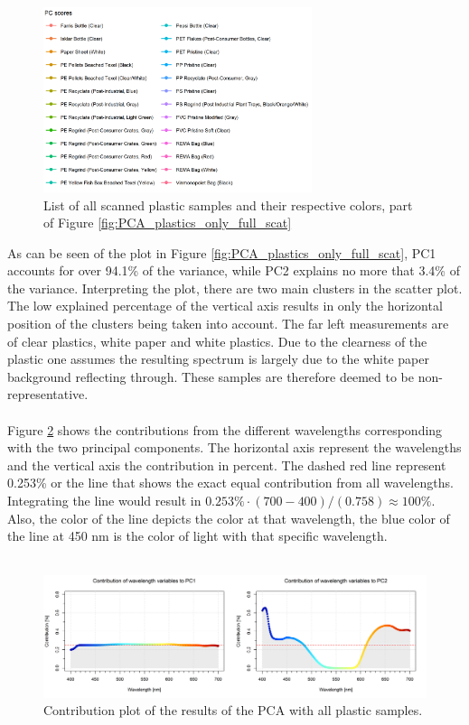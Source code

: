 \begin{figure}[H]
   \centering
    \includegraphics[width=0.7\textwidth]{Images/results/PCA_plastics_full_list.png}
\captionsetup{labelformat=empty}
  \caption[PCA Full Set List]{List of all scanned plastic samples and their respective colors, part of Figure \ref{fig:PCA_plastics_only_full_scat}}
  \label{fig:PCA_plastics_full_list}
\end{figure}
\noindent
As can be seen of the plot in Figure \ref{fig:PCA_plastics_only_full_scat}, PC1 accounts for over 94.1\% of the variance, while PC2 explains no more that 3.4\% of the variance. Interpreting the plot, there are two main clusters in the scatter plot. The low explained percentage of the vertical axis results in only the horizontal position of the clusters being taken into account. The far left measurements are of clear plastics, white paper and white plastics. Due to the clearness of the plastic one assumes the resulting spectrum is largely due to the white paper background reflecting through. These samples are therefore deemed to be non-representative.
\\\\
Figure \ref{fig:PCA_plastics_full_doub_cont} shows the contributions from the different wavelengths corresponding with the two principal components. The horizontal axis represent the wavelengths and the vertical axis the contribution in percent. The dashed red line represent 0.253\% or the line that shows the exact equal contribution from all wavelengths. Integrating the line would result in $0.253\% \cdot (700 - 400)/(0.758) \approx 100\%$. Also, the color of the line depicts the color at that wavelength, the blue color of the line at 450 nm is the color of light with that specific wavelength. 
\\\\
\begin{figure}[H]
    \centering
    \includegraphics[width=1\textwidth]{Images/results/PCA_plastics_full_doub_cont.png}
    \caption[Contribution Plot Full Set]{Contribution plot of the results of the PCA with all plastic samples.}
    \label{fig:PCA_plastics_full_doub_cont}
\end{figure}
